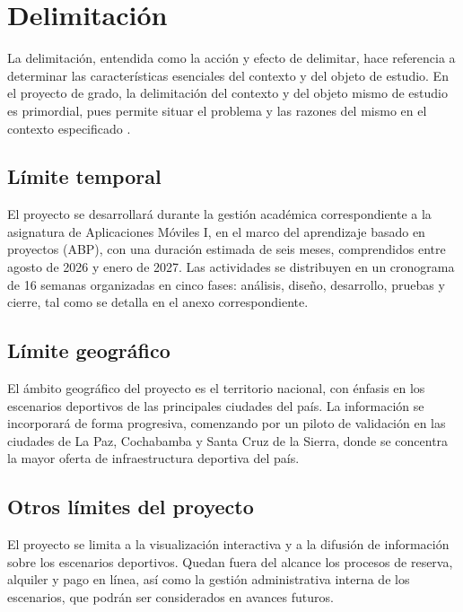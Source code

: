 
\section{Delimitaci\'on}

La delimitaci\'on, entendida como la acci\'on y efecto de delimitar, hace
referencia a determinar las caracter\'isticas esenciales del contexto y del
objeto de estudio. En el proyecto de grado, la delimitaci\'on del contexto y del
objeto mismo de estudio es primordial, pues permite situar el problema y las
razones del mismo en el contexto especificado \citep{arias2012}.

\subsection{L\'imite temporal}

El proyecto se desarrollar\'a durante la gesti\'on acad\'emica correspondiente a
la asignatura de Aplicaciones M\'oviles I, en el marco del aprendizaje basado en
proyectos (ABP), con una duraci\'on estimada de seis meses, comprendidos entre
agosto de 2026 y enero de 2027. Las actividades se distribuyen en un
cronograma de 16 semanas organizadas en cinco fases: an\'alisis, dise\~no,
desarrollo, pruebas y cierre, tal como se detalla en el anexo correspondiente.

\subsection{L\'imite geogr\'afico}

El \'ambito geogr\'afico del proyecto es el territorio nacional, con \'enfasis en
los escenarios deportivos de las principales ciudades del pa\'is. La
informaci\'on se incorporar\'a de forma progresiva, comenzando por un piloto de
validaci\'on en las ciudades de La Paz, Cochabamba y Santa Cruz de la Sierra,
donde se concentra la mayor oferta de infraestructura deportiva del pa\'is.

\subsection{Otros l\'imites del proyecto}

El proyecto se limita a la visualizaci\'on interactiva y a la difusi\'on de
informaci\'on sobre los escenarios deportivos. Quedan fuera del alcance los
procesos de reserva, alquiler y pago en l\'inea, as\'i como la gesti\'on
administrativa interna de los escenarios, que podr\'an ser considerados en
avances futuros.
